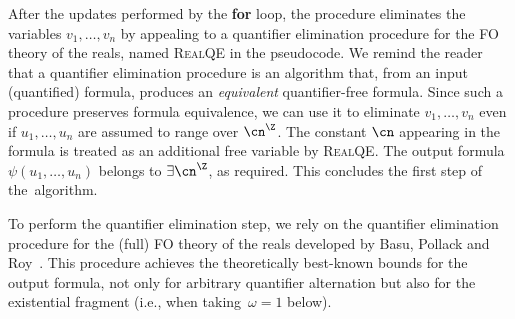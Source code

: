 After the updates performed by the \textbf{for} loop, the procedure eliminates
the variables $v_1,\dots,v_n$ by appealing to a quantifier elimination procedure
for the FO theory of the reals, named \textsc{RealQE} in the pseudocode. We
remind the reader that a quantifier elimination procedure is an algorithm that, 
from an input (quantified) formula, produces an \emph{equivalent} quantifier-free
formula. Since such a procedure preserves formula equivalence, we can use it to
eliminate $v_1,\dots,v_n$ even if $u_1,\dots,u_n$ are assumed to range over
$\ipow{\cn}$.
The constant $\cn$ appearing in the formula is treated as an
additional free variable by \textsc{RealQE}. The output formula
$\psi(u_1,\dots,u_n)$ belongs to $\exists\ipow{\cn}$, as required. This
concludes the first step of the~algorithm.

To perform the quantifier elimination step, we rely on the
quantifier elimination procedure for the (full) FO theory of the reals developed
by Basu, Pollack and Roy~\cite{BasuPR96}. This procedure achieves the
theoretically best-known bounds for the output formula, not only for 
arbitrary
quantifier alternation but also for the existential
fragment (i.e., when taking~$\omega = 1$ below).

